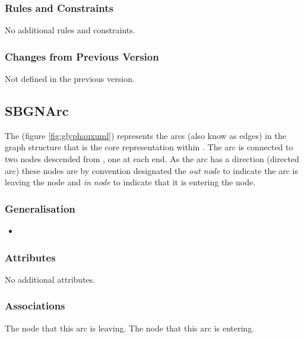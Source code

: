 \subsubsection{Rules and Constraints}

No additional rules and constraints.

\subsubsection{Changes from Previous Version}

Not defined in the previous version.

\subsection{SBGNArc}
\label{defn:SBGNArc}

The  (figure \ref{fig:glyphauxuml}) represents the arcs (also know as edges) in
the graph structure that is the core representation within \PDl. The
arc is connected to two nodes descended from , one
at each end. As the arc has a direction (directed arc) these nodes are
by convention designated the \emph{out node} to indicate the arc is
leaving the node and \emph{in node} to indicate that it is entering
the node.

\subsubsection{Generalisation}

\begin{itemize}
\item {}
\end{itemize}

\subsubsection{Attributes}

No additional attributes.

\subsubsection{Associations}

\begin{attributes}
   The node that this arc is leaving.
   The node that this arc is entering.
\end{attributes}

